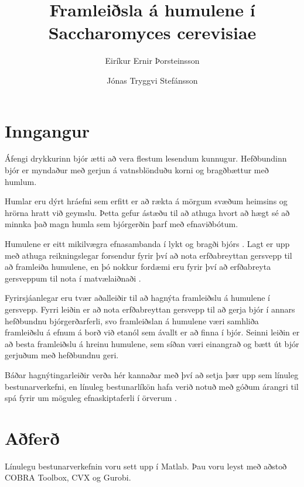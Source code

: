 \documentclass[11pt]{article}
\title{Framleiðsla á humulene í Saccharomyces cerevisiae}
\author{Eiríkur Ernir Þorsteinsson \and Jónas Tryggvi Stefánsson}
\date{}
\begin{document}
\maketitle

\setlength{\columnsep}{1cm}

\begin{abstract}
\lipsum[150]
\end{abstract}

\vspace{1cm}
\begin{multicols}{2}

\section{Inngangur}
Áfengi drykkurinn bjór ætti að vera flestum lesendum kunnugur. Hefðbundinn bjór er myndaður með gerjun á vatnsblönduðu korni og bragðbættur með humlum.

Humlar eru dýrt hráefni sem erfitt er að rækta á mörgum svæðum heimsins og hrörna hratt við geymslu. Þetta gefur ástæðu til að athuga hvort að hægt sé að minnka það magn humla sem bjórgerðin þarf með efnaviðbótum.

Humulene\cite[KEGG: C09684]{Kanehisa01012000} er eitt mikilvægra efnasambanda í lykt og bragði bjórs \cite{howard1957evaluation}. Lagt er upp með athuga reikningslegar forsendur fyrir því að nota erfðabreyttan gersvepp til að framleiða humulene, en þó nokkur fordæmi eru fyrir því að erfðabreyta gersveppum til nota í matvælaiðnaði \cite{dequin2001potential}.

Fyrirsjáanlegar eru tvær aðalleiðir til að hagnýta framleiðslu á humulene í gersvepp. Fyrri leiðin er að nota erfðabreyttan gersvepp til að gerja bjór í annars hefðbundnu bjórgerðarferli, svo framleiðslan á humulene væri samhliða framleiðslu á efnum á borð við etanól sem ávallt er að finna í bjór. Seinni leiðin er að besta framleiðslu á hreinu humulene, sem síðan væri einangrað og bætt út bjór gerjuðum með hefðbundnu geri.

Báðar hagnýtingarleiðir verða hér kannaðar með því að setja þær upp sem línuleg bestunarverkefni, en línuleg bestunarlíkön hafa verið notuð með góðum árangri til spá fyrir um möguleg efnaskiptaferli í örverum \cite{banga2008optimization,edwards2001silico}.
\section{Aðferð}
Línulegu bestunarverkefnin voru sett upp í Matlab. Þau voru leyst með aðstoð COBRA Toolbox, CVX og Gurobi.


\end{multicols}
\end{document}
